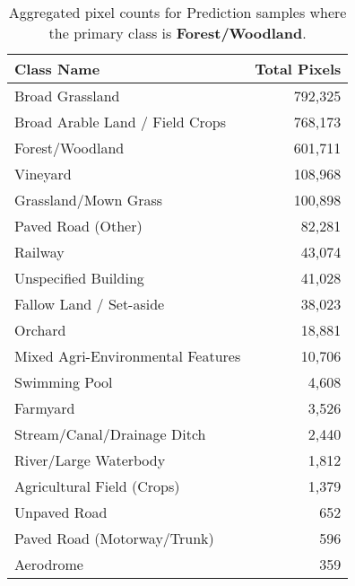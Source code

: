 \begin{table}[H] %
    \centering
    \caption{Aggregated pixel counts for Prediction samples where the primary class is \textbf{Forest/Woodland}.}
    \label{tab:pred_counts_10}
    \begin{tabular}{lr}
        \hline
        \textbf{Class Name} & \textbf{Total Pixels} \\
        \hline
        Broad Grassland & 792,325 \\
        Broad Arable Land / Field Crops & 768,173 \\
        Forest/Woodland & 601,711 \\
        Vineyard & 108,968 \\
        Grassland/Mown Grass & 100,898 \\
        Paved Road (Other) & 82,281 \\
        Railway & 43,074 \\
        Unspecified Building & 41,028 \\
        Fallow Land / Set-aside & 38,023 \\
        Orchard & 18,881 \\
        Mixed Agri-Environmental Features & 10,706 \\
        Swimming Pool & 4,608 \\
        Farmyard & 3,526 \\
        Stream/Canal/Drainage Ditch & 2,440 \\
        River/Large Waterbody & 1,812 \\
        Agricultural Field (Crops) & 1,379 \\
        Unpaved Road & 652 \\
        Paved Road (Motorway/Trunk) & 596 \\
        Aerodrome & 359 \\
        \hline
    \end{tabular}
\end{table}

